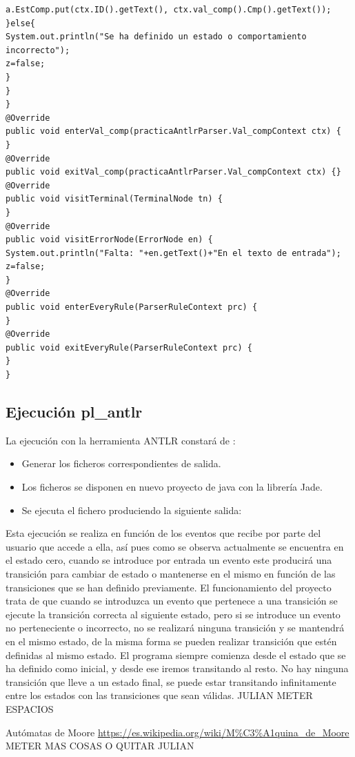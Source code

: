 \documentclass[12pt,a4paper]{article}
\begin{document}
\begin{lstlisting}
a.EstComp.put(ctx.ID().getText(), ctx.val_comp().Cmp().getText());
}else{
System.out.println("Se ha definido un estado o comportamiento incorrecto");
z=false;
}
}
}
@Override
public void enterVal_comp(practicaAntlrParser.Val_compContext ctx) {
}
@Override
public void exitVal_comp(practicaAntlrParser.Val_compContext ctx) {}
@Override
public void visitTerminal(TerminalNode tn) {
}
@Override
public void visitErrorNode(ErrorNode en) {
System.out.println("Falta: "+en.getText()+"En el texto de entrada");
z=false;
}
@Override
public void enterEveryRule(ParserRuleContext prc) {
}
@Override
public void exitEveryRule(ParserRuleContext prc) {
}
}
\end{lstlisting}


\subsection{Ejecución pl\_antlr}
La ejecución con la herramienta ANTLR constará de :
\begin{itemize}
	\item Generar los ficheros correspondientes de salida.
	\item Los ficheros se disponen en nuevo proyecto de java con la librería Jade.
	\item Se ejecuta el fichero produciendo la siguiente salida:
\end{itemize}
Esta ejecución se realiza en función de los eventos que recibe por parte del usuario que accede
a ella, así pues como se observa actualmente se encuentra en el estado cero, cuando se
introduce por entrada un evento este producirá una transición para cambiar de estado o
mantenerse en el mismo en función de las transiciones que se han definido previamente.\newline\newline
El funcionamiento del proyecto trata de que cuando se introduzca un evento que pertenece a una
transición se ejecute la transición correcta al siguiente estado, pero si se introduce un evento no
perteneciente o incorrecto, no se realizará ninguna transición y se mantendrá en el mismo
estado, de la misma forma se pueden realizar transición que estén definidas al mismo estado.  \newline\newline
El programa siempre comienza desde el estado que se ha definido como inicial, y desde ese
iremos transitando al resto.
No hay ninguna transición que lleve a un estado final, se puede estar transitando infinitamente
entre los estados con las transiciones que sean válidas.
JULIAN METER ESPACIOS
\clearpage	
	\begin{thebibliography}{99}
		 Autómatas de Moore \url{https://es.wikipedia.org/wiki/M%C3%A1quina_de_Moore}
		 METER MAS COSAS O QUITAR JULIAN
	
	\end{thebibliography}	
	
\end{document}
